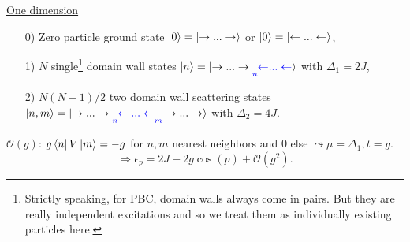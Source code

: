 \noindent \underline{One dimension}
\begin{enumerate}
	\item[0)] Zero particle ground state $\ket{0} = \ket{\rightarrow ... \rightarrow}$ or $\ket{0} = \ket{\leftarrow ... \leftarrow}$,
	\item[1)] $N$ single\footnote{Strictly speaking, for PBC, domain walls always come in pairs. But they are really independent excitations and so we treat them as individually existing particles here.} domain wall states $\ket{n} =  \ket{\rightarrow ... \rightarrow \underset{\textcolor{blue}{n}}{}\textcolor{blue}{\leftarrow} \textcolor{blue}{ ... \leftarrow}}$ with $\Delta_1 = 2J$,
	\item[2)] $N(N-1)/2$ two domain wall scattering states $\ket{n, m} = \ket{\rightarrow ... \rightarrow \underset{\textcolor{blue}{n}}{} \textcolor{blue} {\leftarrow}\: \textcolor{blue}{ ... \leftarrow} \underset{\textcolor{blue}{m}}{} \rightarrow ... \rightarrow}$ with $\Delta_2 = 4J$.
\end{enumerate}
\noindent $\mathcal{O}(g)$: $g \bra{n} V \ket{m} = -g$ for $n, m$ nearest neighbors and $0$ else $\leadsto \mu = \Delta_1, t = g$. \\
\begin{equation} \label{eq:dispersion_small_g}
	\Rightarrow \epsilon_p = 2J - 2g \cos(p) + \mathcal{O}(g^2).
\end{equation}

